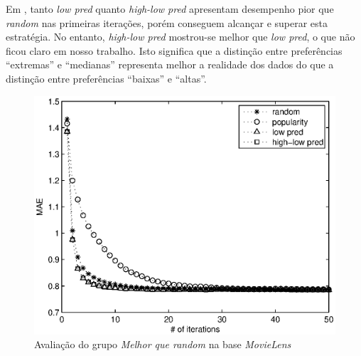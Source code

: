 Em \citep{Elahi:2014:ALS:2542182.2542195}, tanto \textit{low pred} quanto \textit{high-low pred} apresentam desempenho pior que \textit{random} nas primeiras iterações, porém conseguem alcançar e superar esta estratégia. No entanto, \textit{high-low pred} mostrou-se melhor que \textit{low pred}, o que não ficou claro em nosso trabalho. Isto significa que a distinção entre preferências ``extremas'' e ``medianas'' representa melhor a realidade dos dados do que a distinção entre preferências ``baixas'' e ``altas''. 


\begin{figure}[ht]
\centering
\includegraphics{ml_low_highlow.eps}
\caption{Avaliação do grupo \textit{Melhor que random} na base \textit{MovieLens}}
\label{fig:better-random-movielens}
\end{figure}

